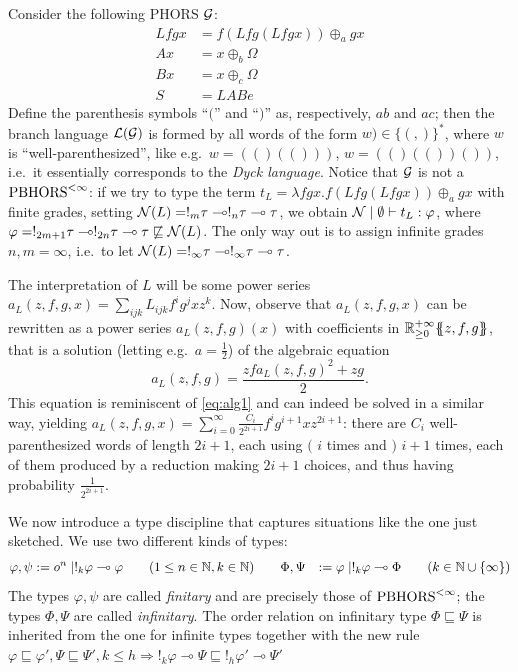 \begin{example}\label{ex:phorsLfx}
Consider the following PHORS $\mathcal{G}$:
{\small \begin{align*}
Lfgx&= f(Lfg(Lfgx))\oplus_{a}gx\\
Ax&=x\oplus_b \Omega\\
Bx&=x\oplus_c \Omega\\
S&=LAB e
\end{align*}}
Define the parenthesis symbols ``$($'' and ``$)$'' as, respectively, $ab$ and $ac$; then the branch language $\mathcal{L}(\mathcal{G})$ is formed by all words of the form $w)\in \{(,)\}^*$, where $w$ is ``well-parenthesized'', like e.g.~$w=(()(()))$, $w=(()(())())$, i.e.~it essentially corresponds to the \emph{Dyck language}.
Notice that $\mathcal{G}$ is not a $\text{PBHORS}^{<\infty}$: 
if we try to type the term $t_L=\lambda fgx. f(Lfg(Lfgx))\oplus_{a}gx$ with finite grades, setting
$\mathcal{N}(L)=!_{m}\tau\multimap!_n\tau\multimap\tau$, we obtain
$\mathcal{N}\mid \emptyset\vdash t_L: \varphi$, where $\varphi= !_{2m+1}\tau\multimap !_{2n}\tau\multimap \tau\not\sqsubseteq\mathcal{N}(L)$.
The only way out is to assign infinite grades $n,m=\infty$, i.e.~to let 
$\mathcal{N}(L)=!_\infty \tau\multimap !_\infty\tau\multimap\tau$.

The interpretation of $L$ will be some power series $a_L(z,f,g,x)=\sum_{ijk}L_{ijk}f^ig^jxz^k$.
Now, observe that $a_L(z,f,g,x)$ can be rewritten as a power series $a_L(z,f,g)(x)$ with coefficients in ${\mathbb{R}^{+\infty}_{\geq 0}}\{\!\!\{z,f,g\}\!\!\}$, that is a solution (letting e.g.~$a=\frac{1}{2}$) of the algebraic equation 
\begin{equation}\label{eq:catalan2}
a_L(z,f,g)=\frac{zf a_L(z,f,g)^2+zg}{2}.
\end{equation}
This equation is reminiscent of \eqref{eq:alg1} and can indeed be solved in a similar way, yielding $a_L(z,f,g,x)=\sum_{i=0}^{\infty}\frac{C_i}{2^{2i+1}}f^ig^{i+1}xz^{2i+1}$: there are 
$C_i$ well-parenthesized words of length $2i+1$, each using $($ $i$ times and $)$ $i+1$ times, each of them produced by a reduction making $2i+1$ choices, and thus having probability $\frac{1}{2^{2i+1}}$.
\end{example}

We now introduce a type discipline that captures situations like the one just sketched.
We use two different kinds of types:
\begin{align*}
\varphi,\psi&:= o^n\mid !_k\varphi\multimap \varphi\qquad (1\leq n\in \mathbb{N}, k\in \mathbb{N}) \qquad
\Phi,\Psi&:=\varphi\mid !_k\varphi\multimap \Phi\qquad (k\in \mathbb{N}\cup\{\infty\})
\end{align*}
The types $\varphi,\psi$ are called \emph{finitary} and are precisely those of $\text{PBHORS}^{<\infty}$; the types $\Phi,\Psi$ are called \emph{infinitary}. The order relation on infinitary type $\Phi\sqsubseteq\Psi$ is inherited from the one for infinite types together with the new rule 
$\varphi\sqsubseteq\varphi',\Psi\sqsubseteq\Psi', k\leq h\Rightarrow !_k\varphi\multimap \Psi\sqsubseteq !_h\varphi'\multimap\Psi'$

